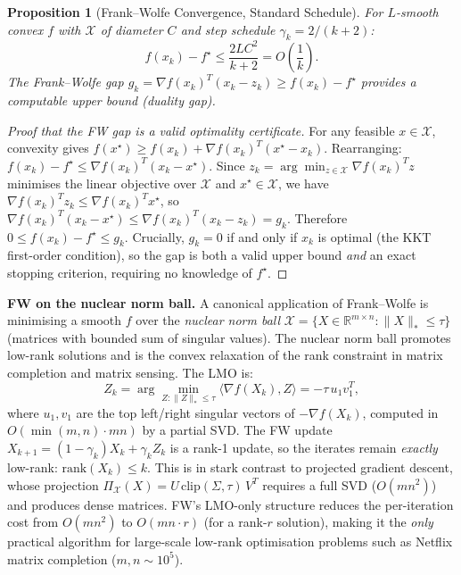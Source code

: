 \documentclass[11pt,a4paper]{article}
\newtheorem{proposition}[theorem]{Proposition}
\theoremstyle{definition}
\begin{document}
\begin{proposition}[Frank--Wolfe Convergence, Standard Schedule]
For $L$-smooth convex $f$ with $\mathcal{X}$ of diameter $C$ and step schedule $\gamma_k = 2/(k+2)$:
\begin{equation}
f(x_k) - f^{\star} \leq \frac{2LC^2}{k+2} = O\!\left(\frac{1}{k}\right).
\end{equation}
The Frank--Wolfe gap $g_k = \nabla f(x_k)^T(x_k - z_k) \geq f(x_k) - f^{\star}$ provides a computable upper bound (duality gap).
\end{proposition}

\begin{proof}[Proof that the FW gap is a valid optimality certificate]
For any feasible $x \in \mathcal{X}$, convexity gives $f(x^{\star}) \geq f(x_k) + \nabla f(x_k)^T(x^{\star} - x_k)$. Rearranging: $f(x_k) - f^{\star} \leq \nabla f(x_k)^T(x_k - x^{\star})$. Since $z_k = \arg\min_{z \in \mathcal{X}} \nabla f(x_k)^T z$ minimises the linear objective over $\mathcal{X}$ and $x^{\star} \in \mathcal{X}$, we have $\nabla f(x_k)^T z_k \leq \nabla f(x_k)^T x^{\star}$, so $\nabla f(x_k)^T(x_k - x^{\star}) \leq \nabla f(x_k)^T(x_k - z_k) = g_k$. Therefore $0 \leq f(x_k) - f^{\star} \leq g_k$. Crucially, $g_k = 0$ if and only if $x_k$ is optimal (the KKT first-order condition), so the gap is both a valid upper bound \emph{and} an exact stopping criterion, requiring no knowledge of $f^{\star}$.
\end{proof}

\noindent\textbf{FW on the nuclear norm ball.} A canonical application of Frank--Wolfe is minimising a smooth $f$ over the \emph{nuclear norm ball} $\mathcal{X} = \{X \in \mathbb{R}^{m\times n} : \|X\|_* \leq \tau\}$ (matrices with bounded sum of singular values). The nuclear norm ball promotes low-rank solutions and is the convex relaxation of the rank constraint in matrix completion and matrix sensing. The LMO is:
\begin{equation}
Z_k = \arg\min_{Z : \|Z\|_* \leq \tau} \langle \nabla f(X_k), Z \rangle = -\tau \, u_1 v_1^T,
\end{equation}
where $u_1, v_1$ are the top left/right singular vectors of $-\nabla f(X_k)$, computed in $O(\min(m,n) \cdot mn)$ by a partial SVD. The FW update $X_{k+1} = (1-\gamma_k)X_k + \gamma_k Z_k$ is a rank-1 update, so the iterates remain \emph{exactly} low-rank: $\text{rank}(X_k) \leq k$. This is in stark contrast to projected gradient descent, whose projection $\Pi_{\mathcal{X}}(X) = U\,\text{clip}(\Sigma, \tau)\,V^T$ requires a full SVD ($O(mn^2)$) and produces dense matrices. FW's LMO-only structure reduces the per-iteration cost from $O(mn^2)$ to $O(mn \cdot r)$ (for a rank-$r$ solution), making it the \emph{only} practical algorithm for large-scale low-rank optimisation problems such as Netflix matrix completion ($m, n \sim 10^5$).
\end{document}
